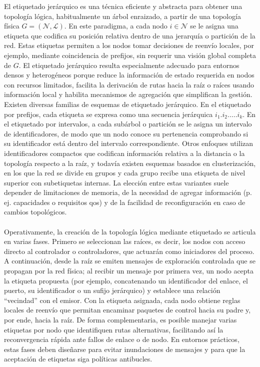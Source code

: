 El etiquetado jerárquico es una técnica eficiente y abstracta para obtener una topología lógica, habitualmente un árbol enraizado, a partir de una topología física \(G=(\mathcal{N},\mathcal{L})\). En este paradigma, a cada nodo \(i\in\mathcal{N}\) se le asigna una etiqueta que codifica su posición relativa dentro de una jerarquía o partición de la red. Estas etiquetas permiten a los nodos tomar decisiones de reenvío locales, por ejemplo, mediante coincidencia de prefijos, sin requerir una visión global completa de \(G\). El etiquetado jerárquico resulta especialmente adecuado para entornos densos y heterogéneos porque reduce la información de estado requerida en nodos con recursos limitados, facilita la derivación de rutas hacia la raíz o raíces usando información local y habilita mecanismos de agregación que simplifican la gestión. Existen diversas familias de esquemas de etiquetado jerárquico. En el etiquetado por prefijos, cada etiqueta se expresa como una secuencia jerárquica \(i_1.i_2. \dots .i_k\). En el etiquetado por intervalos, a cada subárbol o partición se le asigna un intervalo de identificadores, de modo que un nodo conoce su pertenencia comprobando si su identificador está dentro del intervalo correspondiente. Otros enfoques utilizan identificadores compactos que codifican información relativa a la distancia o la topología respecto a la raíz, y todavía existen esquemas basados en clusterización, en los que la red se divide en grupos y cada grupo recibe una etiqueta de nivel superior con subetiquetas internas. La elección entre estas variantes suele depender de limitaciones de memoria, de la necesidad de agregar información (p. ej. capacidades o requisitos \gls{qos}) y de la facilidad de reconfiguración en caso de cambios topológicos.\\
\\
Operativamente, la creación de la topología lógica mediante etiquetado se articula en varias fases. Primero se seleccionan las raíces, es decir, los nodos con acceso directo al controlador o controladores, que actuarán como iniciadores del proceso. A continuación, desde la raíz se emiten mensajes de exploración controlada que se propagan por la red física; al recibir un mensaje por primera vez, un nodo acepta la etiqueta propuesta (por ejemplo, concatenando un identificador del enlace, el puerto, su identificador o un sufijo jerárquico) y establece una relación ``vecindad'' con el emisor. Con la etiqueta asignada, cada nodo obtiene reglas locales de reenvío que permitan encaminar paquetes de control hacia su padre y, por ende, hacia la raíz. De forma complementaria, es posible manejar varias etiquetas por nodo que identifiquen rutas alternativas, facilitando así la reconvergencia rápida ante fallos de enlace o de nodo. En entornos prácticos, estas fases deben diseñarse para evitar inundaciones de mensajes y para que la aceptación de etiquetas siga políticas antibucles.\\

